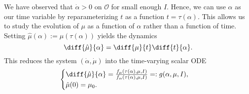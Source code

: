 %

We have observed that \(\dot{\alpha} > 0\) on \(\mathcal{O}\) for small enough \(I\). 
Hence, we can use \(\alpha\) as our time variable by reparameterizing \(t\) as a
function \(t = \tau(\alpha)\).
This allows us to study the evolution of \(\mu\) as a function of \(\alpha\)
rather than a function of time.
Setting \(\hat{\mu}(\alpha) := \mu(\tau(\alpha))\) yields the dynamics
\[
    \diff{\hat{\mu}}{\alpha} = 
    \diff{\mu}{t} \diff{t}{\alpha}
    .
\] 
This reduces the system \((\dot{\alpha},\dot{\mu})\) into the time-varying
scalar ODE 
\begin{equation}\label{eqn:muhat-dot}
    \begin{cases}
        \diff{\hat{\mu}}{\alpha} 
        = \frac{f_\mu(\tau(\alpha),\mu,I)}{f_\alpha(\tau(\alpha),\mu,I)}
        =: g(\alpha,\mu,I)
        , \\
        \hat{\mu}(0) = \mu_0
        .
    \end{cases}
\end{equation}

